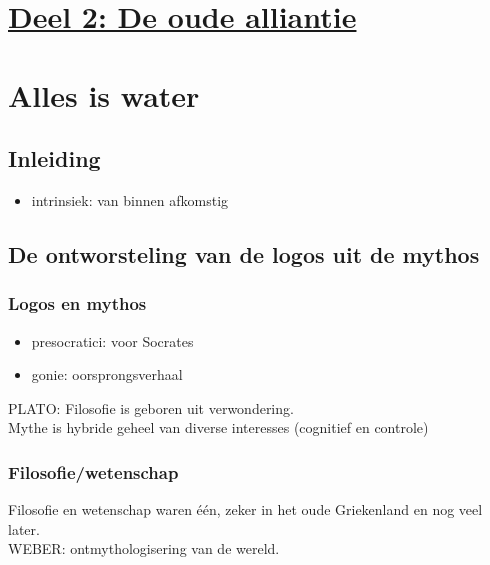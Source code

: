 \section*{\centering \underline{Deel 2: De oude alliantie}}
\section{Alles is water}

\subsection{Inleiding}
\begin{itemize}
\item intrinsiek: van binnen afkomstig
\end{itemize}
\subsection{De ontworsteling van de logos uit de mythos}
\subsubsection{Logos en mythos}
\begin{itemize}
\item presocratici: voor Socrates
\item gonie: oorsprongsverhaal
\end{itemize}
PLATO: Filosofie is geboren uit verwondering.
\\
Mythe is hybride geheel van diverse interesses (cognitief en controle)
\subsubsection{Filosofie/wetenschap}
Filosofie en wetenschap waren \'e\'en, zeker in het oude Griekenland en nog veel later.
\\
WEBER: ontmythologisering van de wereld.
